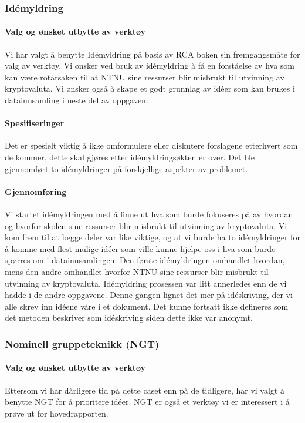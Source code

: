 \subsubsection{Idémyldring}
\paragraph{Valg og ønsket utbytte av verktøy}
Vi har valgt å benytte Idémyldring på basis av RCA boken \cite{RCA} sin fremgangsmåte for valg av verktøy. 
Vi ønsker ved bruk av idémyldring å få en forståelse av hva som kan være rotårsaken til at NTNU sine ressurser blir misbrukt til utvinning av kryptovaluta. Vi ønsker også å skape et godt grunnlag av idéer som kan brukes i datainnsamling i neste del av oppgaven.

\paragraph{Spesifiseringer}
Det er spesielt viktig å ikke omformulere eller diskutere forslagene etterhvert som de kommer, dette skal gjøres etter idémyldringsøkten er over. Det ble gjennomført to idémyldringer på forskjellige aspekter av problemet. 

\paragraph{Gjennomføring}
Vi startet idémyldringen med å finne ut hva som burde fokuseres på av hvordan og hvorfor skolen sine ressurser blir misbrukt til utvinning av kryptovaluta. Vi kom frem til at begge deler var like viktige, og at vi burde ha to idémyldringer for å komme med flest mulige idéer som ville kunne hjelpe oss i hva som burde spørres om i datainnsamlingen. Den første idémyldringen omhandlet hvordan, mens den andre omhandlet hvorfor NTNU sine ressurser blir misbrukt til utvinning av kryptovaluta. Idémyldring prosessen var litt annerledes enn de vi hadde i de andre oppgavene. Denne gangen lignet det mer på idéskriving, der vi alle skrev inn idéene våre i et dokument. Det kunne fortsatt ikke defineres som det metoden beskriver som idéskriving siden dette ikke var anonymt.


\subsubsection{Nominell gruppeteknikk (NGT)}
\paragraph{Valg og ønsket utbytte av verktøy}
Ettersom vi har dårligere tid på dette caset enn på de tidligere, har vi valgt å benytte NGT for å prioritere idéer. NGT er også et verktøy vi er interessert i å prøve ut for hovedrapporten.

